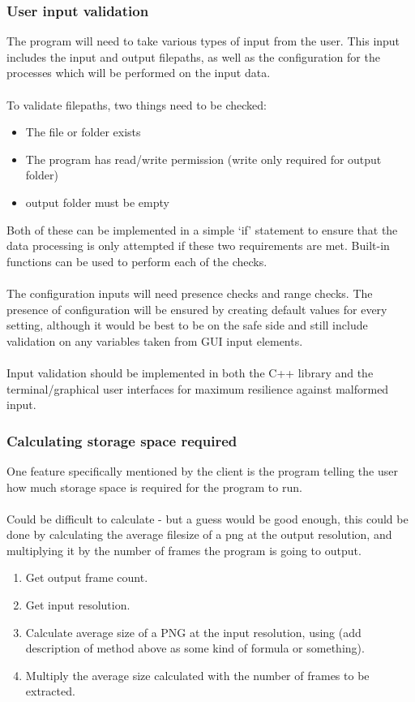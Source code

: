 \documentclass[11pt]{report}
\begin{document}
\subsubsection{User input validation}
The program will need to take various types of input from the user. This input includes the input and output filepaths, as well as the configuration for the processes which will be performed on the input data.\\\\
To validate filepaths, two things need to be checked:
\begin{itemize}
\item The file or folder exists
\item The program has read/write permission (write only required for output folder)
\item output folder must be empty
\end{itemize}
Both of these can be implemented in a simple `if' statement to ensure that the data processing is only attempted if these two requirements are met. Built-in functions can be used to perform each of the checks.\\\\
The configuration inputs will need presence checks and range checks.
The presence of configuration will be ensured by creating default values for every setting, although it would be best to be on the safe side and still include validation on any variables taken from GUI input elements.\\\\
Input validation should be implemented in both the C++ library and the terminal/graphical user interfaces for maximum resilience against malformed input.
\subsubsection{Calculating storage space required}
One feature specifically mentioned by the client is the program telling the user how much storage space is required for the program to run.\\\\
Could be difficult to calculate - but a guess would be good enough, this could be done by calculating the average filesize of a png at the output resolution, and multiplying it by the number of frames the program is going to output.
\begin{enumerate}
\item Get output frame count.
\item Get input resolution.
\item Calculate average size of a PNG at the input resolution, using (add description of method above as some kind of formula or something).
\item Multiply the average size calculated with the number of frames to be extracted.
\end{enumerate}
\end{document}
